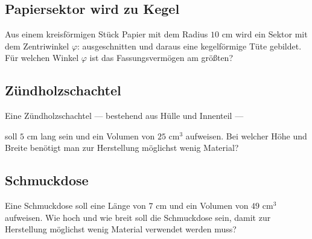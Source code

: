 
\subsection{Papiersektor wird zu Kegel}

Aus einem kreisförmigen Stück Papier mit dem Radius  $10 \text{ cm}$ wird ein Sektor mit dem Zentriwinkel $\varphi$: ausgeschnitten und daraus eine kegelförmige Tüte gebildet. Für welchen Winkel $\varphi$ ist das Fassungsvermögen am größten?





\subsection{Zündholzschachtel}
Eine Zündholzschachtel --- bestehend aus Hülle und Innenteil ---

soll $5 \text{ cm}$ lang sein  und ein Volumen von $25 \text{ cm}^3$ aufweisen. Bei welcher Höhe und Breite benötigt man zur Herstellung möglichst wenig Material?



\subsection{Schmuckdose}

Eine Schmuckdose soll eine Länge von $7 \text{ cm}$ und ein Volumen
von $49 \text{ cm}^3$ aufweisen. Wie hoch und wie breit soll die
Schmuckdose sein, damit zur Herstellung möglichst wenig Material
verwendet werden muss?





